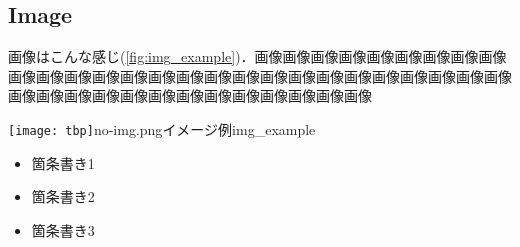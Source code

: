 

  \subsection{Image} %
  \label{sub:image}
    画像はこんな感じ(\ref{fig:img_example})．画像画像画像画像画像画像画像画像画像画像画像画像画像画像画像画像画像画像画像画像画像画像画像画像画像画像画像画像画像画像画像画像画像画像画像画像画像画像画像画像

    \texttt{[image: tbp]}{no-img.png}{イメージ例}{img_example}

    \begin{itemize}
      \item 箇条書き1
      \item 箇条書き2
      \item 箇条書き3
    \end{itemize}



